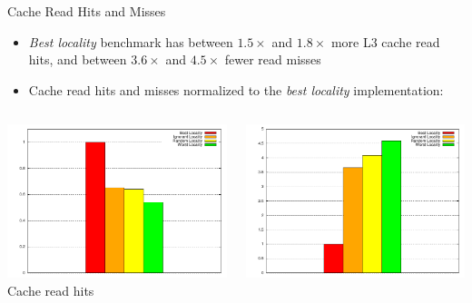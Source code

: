 \begin{frame}{Cache Read Hits and Misses}
  \begin{itemize}
  \item \emph{Best locality} benchmark has between $1.5\times$ and
    $1.8\times$ more L3 cache read hits, and between $3.6\times$ and
    $4.5\times$ fewer read misses
  \item Cache read hits and misses normalized to the \emph{best
      locality} implementation:
  \end{itemize}
  

  \begin{columns}[c]
    \begin{column}{0.50\textwidth}
      \begin{center}
        \includegraphics[width=\textwidth]{figures/cache-stress-test-threads-cache-hits} \\
        \tiny{Cache read hits}     
      \end{center}
    \end{column}
    \begin{column}{0.50\textwidth}
      \begin{center}
        \includegraphics[width=\textwidth]{figures/cache-stress-test-threads-cache-misses} \\

\end{center}
\end{column}
\end{columns}
\end{frame}
